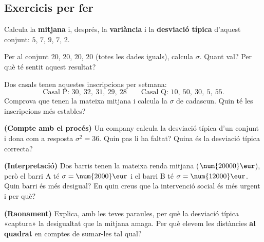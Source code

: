\subsection{Exercicis per fer}

\begin{exercicis}
\begin{exlist}
  \item Calcula la \textbf{mitjana} i, després, la \textbf{variància} i la
        \textbf{desviació típica} d'aquest conjunt: $5$, $7$, $9$, $7$, $2$.
  \item Per al conjunt $20$, $20$, $20$, $20$ (totes les dades iguals), calcula
        $\sigma$. Quant val? Per què té sentit aquest resultat?
  \item Dos casals tenen aquestes inscripcions per setmana:
        \[
        \text{Casal P: } 30,\ 32,\ 31,\ 29,\ 28 \qquad
        \text{Casal Q: } 10,\ 50,\ 30,\ 5,\ 55.
        \]
        Comprova que tenen la mateixa mitjana i calcula la $\sigma$ de cadascun. Quin
        té les inscripcions més estables?
  \item \textbf{(Compte amb el procés)} Un company calcula la desviació típica d'un
        conjunt i dona com a resposta $\sigma^2=36$. Quin pas li ha faltat? Quina és
        la desviació típica correcta?
  \item \textbf{(Interpretació)} Dos barris tenen la mateixa renda mitjana
        ($\num{20000}\eur$), però el barri A té $\sigma=\num{2000}\eur$ i el barri B
        té $\sigma=\num{12000}\eur$. Quin barri és més desigual? En quin creus que la
        intervenció social és més urgent i per què?
  \item \textbf{(Raonament)} Explica, amb les teves paraules, per què la desviació
        típica «captura» la desigualtat que la mitjana amaga. Per què elevem les
        distàncies \textbf{al quadrat} en comptes de sumar-les tal qual?
\end{exlist}
\end{exercicis}

